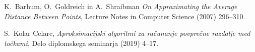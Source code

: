 \documentclass[12pt,a4paper]{amsart}
\theoremstyle{definition} %
\theoremstyle{plain} %
\begin{document}
\vfill

\newpage
\begin{thebibliography}{99}

K.~Barhum, O.~Goldreich in A.~Shraibman \emph{On Approximating the Average Distance Between Points}, Lecture Notes in Computer Science (2007) 296--310.

S.~Kolar Celarc, \emph{Aproksimacijski algoritmi za računanje povprečne razdalje med točkami}, Delo diplomskega seminarja (2019) 4--17.

\end{thebibliography}
\end{document}
